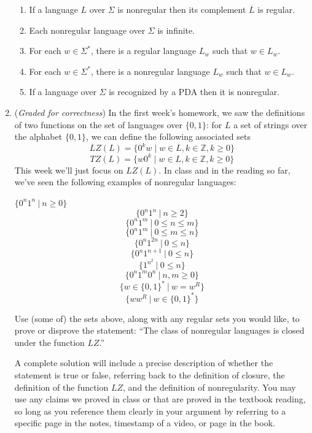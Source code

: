 \documentclass[12pt, oneside]{article}
\begin{document}
\begin{enumerate}
\begin{enumerate}
\item If a language $L$ over $\Sigma$ is nonregular then its complement $\overline{L}$ is regular.
\item Each nonregular language over $\Sigma$ is infinite.
\item For each $w \in \Sigma^*$, there is a regular language $L_{w}$ such that $w \in L_{w}$.
\item For each $w \in \Sigma^*$, there is a nonregular language $L_{w}$ such that $w \in L_{w}$.
\item If a language over $\Sigma$ is recognized by a PDA then it is nonregular.
\end{enumerate}

\item ({\it Graded for correctness}) 
In the first week's homework, 
we saw the definitions of two functions on the set of languages over $\{0,1\}$:
for $L$ a set of strings over the alphabet $\{0,1\}$, we can define the following associated sets
\[
LZ(L) = \{ 0^k w \mid w \in L, k \in \mathbb{Z}, k \geq 0 \}
\]
\[
TZ(L) = \{ w 0^k \mid w \in L, k \in \mathbb{Z}, k \geq 0 \}
\]
This week we'll just focus on $LZ(L)$. 
In class and in the reading so far, we've seen the following examples of nonregular languages:
\begin{multicols}{3}
\begin{center}
$\{ 0^n 1^n ~|~ n \geq 0 \}$
$$\{ 0^n 1^n ~|~ n \geq 2 \}$$
$$\{ 0^n 1^m ~|~  0 \leq n \leq m \}$$
$$\{ 0^n 1^m ~|~ 0 \leq m \leq n \}$$
$$\{ 0^n 1^{2n} ~|~ 0 \leq n \}$$
$$\{ 0^n 1^{n+1} ~|~ 0 \leq n \}$$
$$\{ 1^{n^2} ~|~ 0 \leq n \}$$
$$\{ 0^n 1^m 0^n ~|~n,m \geq 0\}$$
$$\{ w \in \{0,1\}^* ~|~w = w^R\}$$
$$\{ w w^R ~|~ w \in \{0,1\}^*\}$$
\end{center}
\end{multicols}

Use (some of) the sets above, along with any regular sets you would like, to 
prove or disprove the statement: ``The class of nonregular languages
is closed under the function $LZ$.''

A complete solution will include a precise description of whether
the statement is true or false, referring back to the definition of closure, 
the definition of the function $LZ$, and the definition of nonregularity.
You may use any claims we proved in class or that are proved in the textbook reading,
so long as you reference them clearly in your argument by referring to a specific page 
in the notes, timestamp of a video, or page in the book.


\end{enumerate}
\end{document}
